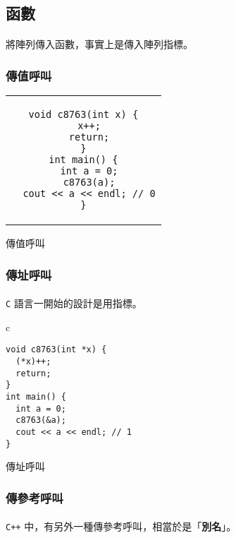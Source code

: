 \documentclass[12pt,a4paper,oneside]{report}
\begin{document}
\begin{CJK}{UTF8}{bkai}
\subsection{函數}

\paragraph{}將陣列傳入函數，事實上是傳入陣列指標。

\subsubsection{傳值呼叫}

\begin{code}[h!]
\centering
\begin{tabular}{c}
\begin{lstlisting}
void c8763(int x) {
  x++;
  return;
}
int main() {
  int a = 0;
  c8763(a);
  cout << a << endl; // 0
}
\end{lstlisting}
\end{tabular}
\caption{傳值呼叫}
\label{program:struct:code:function:pass:value}
\end{code}

\subsubsection{傳址呼叫}

\paragraph{}\texttt{C} 語言一開始的設計是用指標。

\begin{code}[h!]
\centering
\begin{tabular}{c}
\begin{lstlisting}
void c8763(int *x) {
  (*x)++;
  return;
}
int main() {
  int a = 0;
  c8763(&a);
  cout << a << endl; // 1
}
\end{lstlisting}
\end{tabular}
\caption{傳址呼叫}
\label{program:struct:code:function:pass:address}
\end{code}

\subsubsection{傳參考呼叫}

\paragraph{}\texttt{C++} 中，有另外一種傳參考呼叫，相當於是「\textbf{別名}」。


\end{CJK}
\end{document}
